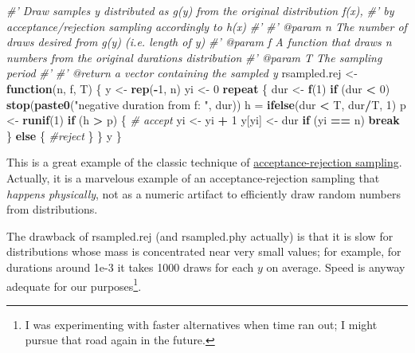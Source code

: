 \documentclass[]{article}
\newenvironment{Shaded}{\begin{snugshade}}{\end{snugshade}}
\newcommand{\CommentTok}[1]{\textcolor[rgb]{0.56,0.35,0.01}{\textit{#1}}}
\newcommand{\ControlFlowTok}[1]{\textcolor[rgb]{0.13,0.29,0.53}{\textbf{#1}}}
\newcommand{\DecValTok}[1]{\textcolor[rgb]{0.00,0.00,0.81}{#1}}
\newcommand{\KeywordTok}[1]{\textcolor[rgb]{0.13,0.29,0.53}{\textbf{#1}}}
\newcommand{\NormalTok}[1]{#1}
\newcommand{\OperatorTok}[1]{\textcolor[rgb]{0.81,0.36,0.00}{\textbf{#1}}}
\newcommand{\StringTok}[1]{\textcolor[rgb]{0.31,0.60,0.02}{#1}}
\begin{document}
\begin{Shaded}
\begin{Highlighting}[]
\CommentTok{#' Draw samples y distributed as g(y) from the original distribution f(x), }
\CommentTok{#'   by acceptance/rejection sampling accordingly to h(x)}
\CommentTok{#'}
\CommentTok{#' @param n      The number of draws desired from g(y) (i.e. length of y)}
\CommentTok{#' @param f      A function that draws n numbers from the original durations distribution}
\CommentTok{#' @param T      The sampling period}
\CommentTok{#'}
\CommentTok{#' @return a vector containing the sampled y}
\NormalTok{rsampled.rej <-}\StringTok{ }\ControlFlowTok{function}\NormalTok{(n, f, T) \{}
\NormalTok{  y <-}\StringTok{ }\KeywordTok{rep}\NormalTok{(}\OperatorTok{-}\DecValTok{1}\NormalTok{, n)}
\NormalTok{  yi <-}\StringTok{ }\DecValTok{0}
  \ControlFlowTok{repeat}\NormalTok{ \{}
\NormalTok{    dur <-}\StringTok{ }\KeywordTok{f}\NormalTok{(}\DecValTok{1}\NormalTok{)}
    \ControlFlowTok{if}\NormalTok{ (dur }\OperatorTok{<}\StringTok{ }\DecValTok{0}\NormalTok{) }\KeywordTok{stop}\NormalTok{(}\KeywordTok{paste0}\NormalTok{(}\StringTok{"negative duration from f: "}\NormalTok{, dur))}
\NormalTok{    h =}\StringTok{ }\KeywordTok{ifelse}\NormalTok{(dur }\OperatorTok{<}\StringTok{ }\NormalTok{T, dur}\OperatorTok{/}\NormalTok{T, }\DecValTok{1}\NormalTok{)}
\NormalTok{    p <-}\StringTok{ }\KeywordTok{runif}\NormalTok{(}\DecValTok{1}\NormalTok{)}
    \ControlFlowTok{if}\NormalTok{ (h }\OperatorTok{>}\StringTok{ }\NormalTok{p) \{}
      \CommentTok{# accept}
\NormalTok{      yi <-}\StringTok{ }\NormalTok{yi }\OperatorTok{+}\StringTok{ }\DecValTok{1}
\NormalTok{      y[yi] <-}\StringTok{ }\NormalTok{dur}
      \ControlFlowTok{if}\NormalTok{ (yi }\OperatorTok{==}\StringTok{ }\NormalTok{n) }\ControlFlowTok{break}
\NormalTok{    \} }\ControlFlowTok{else}\NormalTok{ \{}
      \CommentTok{#reject}
\NormalTok{    \}}
\NormalTok{  \}}
\NormalTok{  y}
\NormalTok{\}}
\end{Highlighting}
\end{Shaded}

This is a great example of the classic technique of
\href{https://en.wikipedia.org/wiki/Rejection_sampling}{acceptance-rejection
sampling}. Actually, it is a marvelous example of an
acceptance-rejection sampling that \emph{happens physically}, not as a
numeric artifact to efficiently draw random numbers from distributions.

The drawback of rsampled.rej (and rsampled.phy actually) is that it is
slow for distributions whose mass is concentrated near very small
values; for example, for durations around 1e-3 it takes 1000 draws for
each \(y\) on average. Speed is anyway adequate for our
purposes\footnote{I was experimenting with faster alternatives when time
  ran out; I might pursue that road again in the future.}.
\end{document}
